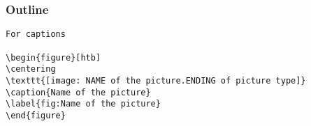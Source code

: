 
\begin{frame}
    \titlepage
\end{frame}
\begin{frame}
    \frametitle{Outline}
    \tableofcontents
\end{frame}

\begin{verbatim}
For captions

\begin{figure}[htb]
\centering
\texttt{[image: NAME of the picture.ENDING of picture type]}
\caption{Name of the picture}
\label{fig:Name of the picture}
\end{figure}
\end{verbatim}
